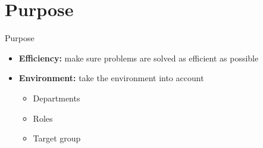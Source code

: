 \section{Purpose}
\begin{frame}{Purpose}

\begin{itemize}
	\item \textbf{Efficiency:} make sure problems are solved as efficient as possible
	\item \textbf{Environment:} take the environment into account
	\begin{itemize}
		\item Departments
		\item Roles
		\item Target group
	\end{itemize}
\end{itemize}


\end{frame}
